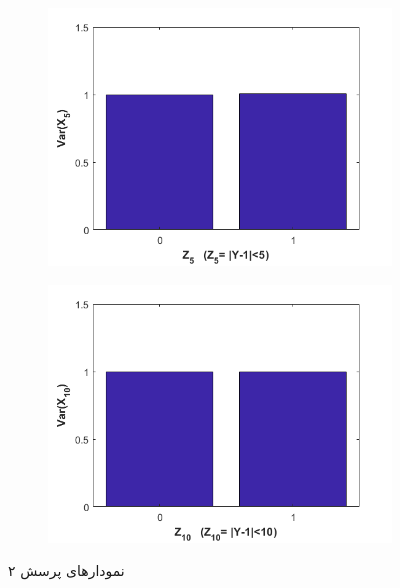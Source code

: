 \documentclass[10pt]{article}
\theoremstyle{definition}
\theoremstyle{lemma}
\theoremstyle{theorem}
\theoremstyle{remark}
\begin{document}
	\begin{figure}[h!]\ContinuedFloat
		\centering
		\begin{subfigure}[h!]{0.8\textwidth}
			\includegraphics[width=\textwidth]{./Images/2/3.png}
			\caption{  }
		\end{subfigure}
		\quad
		\begin{subfigure}[h!]{0.8\textwidth}
			\includegraphics[width=\textwidth]{./Images/2/4.png}
			\caption{  }
		\end{subfigure}
	
		\caption{نمودار‌های پرسش ۲}
		\label{q2}
	\end{figure}
	
\end{document}
